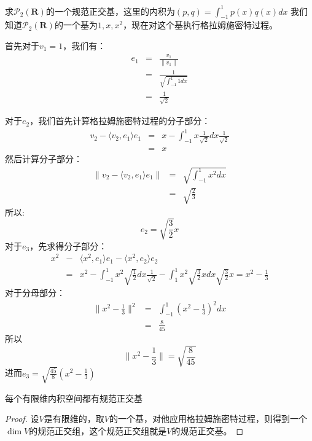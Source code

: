 \documentclass[10pt,a4paper,UTF8]{article}
\begin{document}
\begin{instance}
求\(\mathcal{P}_{2}(\mathbf{R})\)的一个规范正交基，这里的内积为\((p,q)= \int_{-1}^{1}p(x)q(x)dx\)
我们知道\(\mathcal{P}_{2}(\mathbf{R})\)的一个基为\(1,x,x^{2}\)，现在对这个基执行格拉姆施密特过程。

首先对于\(v_{1} = 1\)，我们有：
\begin{eqnarray}
\label{eq:8}
e_{1}&=& \frac{v_{1}}{ \| v_{1} \| } \\
&=& \frac{1}{ \sqrt{\int_{-1}^{1} 1 dx }} \\
&=& \frac{1}{\sqrt{2}}
\end{eqnarray}

对于\(e_{2}\)，我们首先计算格拉姆施密特过程的分子部分：
\begin{eqnarray}
\label{eq:10}
v_{2} - \langle v_{2},e_{1} \rangle e_{1}  &=& x - \int_{-1}^{1} x\frac{1}{\sqrt{2}}dx \frac{1}{\sqrt{2}} \\
&=& x
\end{eqnarray}
然后计算分子部分：
\begin{eqnarray}
\label{eq:11}
\| v_{2} -  \langle v_{2},e_{1} \rangle e_{1}  \| &=& \sqrt{ \int_{-1}^{1} x^{2} dx  } \\
&=& \sqrt{\frac{2}{3}}
\end{eqnarray}
所以:
\begin{equation}
\label{eq:12}
e_{2} = \sqrt{ \frac{3}{2}} x
\end{equation}
对于\(e_{3}\)，先求得分子部分：
\begin{eqnarray}
\label{eq:13}
x^{2} &-& \langle x^{2},e_{1} \rangle e_{1} - \langle x^{2},e_{2} \rangle e_{2}  \\
&=& x^{2} - \int_{-1}^{1}x^{2}\sqrt{\frac{1}{2}}dx \frac{1}{\sqrt{2}} - \int_{1}^{1}x^{2}\sqrt{\frac{3}{2}}x dx \sqrt{\frac{3}{2}}x = x^{2} - \frac{1}{3}
\end{eqnarray}
对于分母部分：
\begin{eqnarray}
\label{eq:14}
\| x^{2} - \frac{1}{3} \|^{2} &=& \int_{-1}^{{1}} (x^{2} - \frac{1}{3})^{2}dx \\
&=& \frac{8}{45}
\end{eqnarray}
所以\[\| x^{2} - \frac{1}{3} \|  = \sqrt{\frac{8}{45}}\]
进而\(e_{3} = \sqrt{\frac{45}{8}} (x^{2} - \frac{1}{3})\)
\end{instance}

\begin{theorem}
每个有限维内积空间都有规范正交基
\end{theorem}

\begin{proof}
设\(V\)是有限维的，取\(V\)的一个基，对他应用格拉姆施密特过程，则得到一个\(\dim V\)的规范正交组，这个规范正交组就是\(V\)的规范正交基。
\end{proof}
\end{document}
